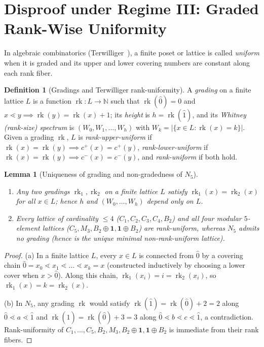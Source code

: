 \documentclass[11pt,a4paper]{article}
\newtheorem{lemma}[theorem]{Lemma}
\theoremstyle{definition}
\newtheorem{definition}[theorem]{Definition}
\theoremstyle{remark}
\newcommand{\cov}{\lessdot}
\newcommand{\rk}{\operatorname{rk}}
\begin{document}
\section{Disproof under Regime III: Graded Rank-Wise Uniformity}

In algebraic combinatorics (Terwilliger~\cite{Terwilliger1990}), a finite poset or lattice is called \emph{uniform} when it is graded and its upper and lower covering numbers are constant along each rank fiber.

\begin{definition}[Gradings and Terwilliger rank-uniformity]\label{def:rank}
A \emph{grading} on a finite lattice $L$ is a function $\rk : L \to \mathbb{N}$ such that $\rk(\hat{0}) = 0$ and $x \cov y \implies \rk(y) = \rk(x) + 1$; its \emph{height} is $h = \rk(\hat{1})$, and its \emph{Whitney (rank-size) spectrum} is $(W_0, W_1, \dots, W_h)$ with $W_k = |\{x \in L : \rk(x) = k\}|$. Given a grading $\rk$, $L$ is \emph{rank-upper-uniform} if $\rk(x) = \rk(y) \implies c^+(x) = c^+(y)$, \emph{rank-lower-uniform} if $\rk(x) = \rk(y) \implies c^-(x) = c^-(y)$, and \emph{rank-uniform} if both hold.
\end{definition}

\begin{lemma}[Uniqueness of grading and non-gradedness of $N_5$]\label{lem:grading}
\leavevmode
\begin{enumerate}
  \item[(a)] Any two gradings $\rk_1, \rk_2$ on a finite lattice $L$ satisfy $\rk_1(x) = \rk_2(x)$ for all $x \in L$; hence $h$ and $(W_0, \dots, W_h)$ depend only on $L$.
  \item[(b)] Every lattice of cardinality $\le 4$ ($C_1, C_2, C_3, C_4, B_2$) and all four modular $5$-element lattices ($C_5, M_3, B_2 \oplus \mathbf{1}, \mathbf{1} \oplus B_2$) are rank-uniform, whereas $N_5$ admits no grading (hence is the unique minimal non-rank-uniform lattice).
\end{enumerate}
\end{lemma}
\begin{proof}
(a) In a finite lattice $L$, every $x \in L$ is connected from $\hat{0}$ by a covering chain $\hat{0} = x_0 \cov x_1 \cov \dots \cov x_k = x$ (constructed inductively by choosing a lower cover when $x > \hat{0}$). Along this chain, $\rk_1(x_i) = i = \rk_2(x_i)$, so $\rk_1(x) = k = \rk_2(x)$.

(b) In $N_5$, any grading $\rk$ would satisfy $\rk(\hat{1}) = \rk(\hat{0}) + 2 = 2$ along $\hat{0} \cov a \cov \hat{1}$ and $\rk(\hat{1}) = \rk(\hat{0}) + 3 = 3$ along $\hat{0} \cov b \cov c \cov \hat{1}$, a contradiction. Rank-uniformity of $C_1, \dots, C_5, B_2, M_3, B_2 \oplus \mathbf{1}, \mathbf{1} \oplus B_2$ is immediate from their rank fibers.
\end{proof}
\end{document}
